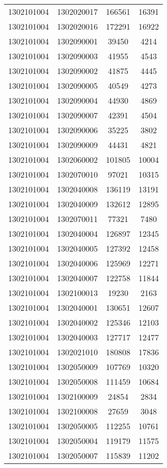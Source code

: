 \begin{longtable}[h]{llcc}
		1302101004 & 1302020017 & 166561 & 16391\\
		1302101004 & 1302020016 & 172291 & 16922\\
		1302101004 & 1302090001 & 39450 & 4214\\
		1302101004 & 1302090003 & 41955 & 4543\\
		1302101004 & 1302090002 & 41875 & 4445\\
		1302101004 & 1302090005 & 40549 & 4273\\
		1302101004 & 1302090004 & 44930 & 4869\\
		1302101004 & 1302090007 & 42391 & 4504\\
		1302101004 & 1302090006 & 35225 & 3802\\
		1302101004 & 1302090009 & 44431 & 4821\\
		1302101004 & 1302060002 & 101805 & 10004\\
		1302101004 & 1302070010 & 97021 & 10315\\
		1302101004 & 1302040008 & 136119 & 13191\\
		1302101004 & 1302040009 & 132612 & 12895\\
		1302101004 & 1302070011 & 77321 & 7480\\
		1302101004 & 1302040004 & 126897 & 12345\\
		1302101004 & 1302040005 & 127392 & 12458\\
		1302101004 & 1302040006 & 125969 & 12271\\
		1302101004 & 1302040007 & 122758 & 11844\\
		1302101004 & 1302100013 & 19230 & 2163\\
		1302101004 & 1302040001 & 130651 & 12607\\
		1302101004 & 1302040002 & 125346 & 12103\\
		1302101004 & 1302040003 & 127717 & 12477\\
		1302101004 & 1302021010 & 180808 & 17836\\
		1302101004 & 1302050009 & 107769 & 10320\\
		1302101004 & 1302050008 & 111459 & 10684\\
		1302101004 & 1302100009 & 24854 & 2834\\
		1302101004 & 1302100008 & 27659 & 3048\\
		1302101004 & 1302050005 & 112255 & 10761\\
		1302101004 & 1302050004 & 119179 & 11575\\
		1302101004 & 1302050007 & 115839 & 11202\\

\end{longtable}
